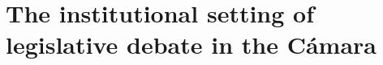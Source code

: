 \documentclass[letter,12pt]{article}
\begin{document}
\section{The institutional setting of legislative debate in the Cámara} %



\end{document}
